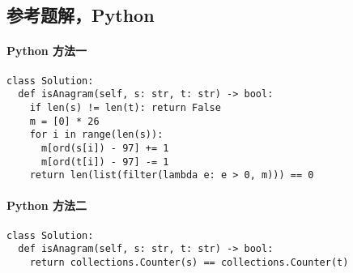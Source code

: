 \subsection{参考题解，Python}

\paragraph{Python 方法一}

\begin{verbatim}
class Solution:
  def isAnagram(self, s: str, t: str) -> bool:
    if len(s) != len(t): return False
    m = [0] * 26
    for i in range(len(s)):
      m[ord(s[i]) - 97] += 1
      m[ord(t[i]) - 97] -= 1
    return len(list(filter(lambda e: e > 0, m))) == 0
\end{verbatim}

\paragraph{Python 方法二}

\begin{verbatim}
class Solution:
  def isAnagram(self, s: str, t: str) -> bool:
    return collections.Counter(s) == collections.Counter(t)
\end{verbatim}
